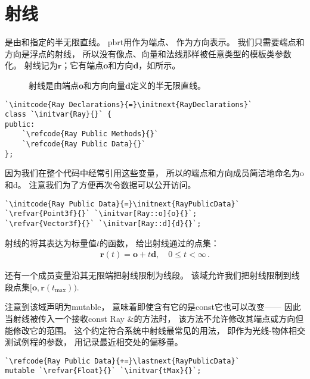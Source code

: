 \section{射线}\label{sec:射线}

是由和指定的半无限直线。
pbrt用作为端点、
作为方向表示。
我们只需要端点和方向是浮点的射线，
所以没有像点、向量和法线那样被任意类型的模板类参数化。
射线记为$\bm r$；它有端点$\bm o$和方向$\bm d$，如所示。
\begin{figure}[htbp]
    \centering
    \caption{射线是由端点$\bm o$和方向向量$\bm d$定义的半无限直线。}
    \label{fig:2.7}
\end{figure}

\begin{lstlisting}
`\initcode{Ray Declarations}{=}\initnext{RayDeclarations}`
class `\initvar{Ray}{}` {
public:
    `\refcode{Ray Public Methods}{}`
    `\refcode{Ray Public Data}{}`
};
\end{lstlisting}

因为我们在整个代码中经常引用这些变量，
所以的端点和方向成员简洁地命名为{\ttfamily o}和{\ttfamily d}。
注意我们为了方便再次令数据可以公开访问。
\begin{lstlisting}
`\initcode{Ray Public Data}{=}\initnext{RayPublicData}`
`\refvar{Point3f}{}` `\initvar[Ray::o]{o}{}`;
`\refvar{Vector3f}{}` `\initvar[Ray::d]{d}{}`;
\end{lstlisting}

射线的将其表达为标量值$t$的函数，
给出射线通过的点集：
\begin{align}\label{eq:2.3}
    \bm r(t)=\bm o+t\bm d,\quad 0\le t<\infty\, .
\end{align}

还有一个成员变量沿其无限端把射线限制为线段。
该域允许我们把射线限制到线段点集$[\bm o,\bm r(t_{\max}))$.

注意到该域声明为{\ttfamily mutable}，
意味着即使含有它的是{\ttfamily const}它也可以改变——
因此当射线被传入一个接收{\ttfamily const Ray \&}的方法时，
该方法不允许修改其端点或方向但能修改它的范围。
这个约定符合系统中射线最常见的用法，
即作为光线-物体相交测试例程的参数，
用记录最近相交处的偏移量。
\begin{lstlisting}
`\refcode{Ray Public Data}{+=}\lastnext{RayPublicData}`
mutable `\refvar{Float}{}` `\initvar{tMax}{}`;
\end{lstlisting}

